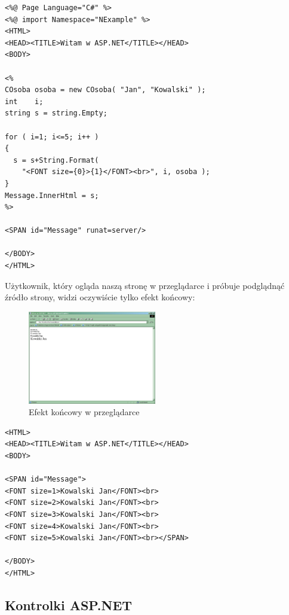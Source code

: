 \begin{scriptsize}
\begin{verbatim}
<%@ Page Language="C#" %>
<%@ import Namespace="NExample" %>
<HTML>
<HEAD><TITLE>Witam w ASP.NET</TITLE></HEAD>
<BODY>

<%
COsoba osoba = new COsoba( "Jan", "Kowalski" );
int    i;
string s = string.Empty;

for ( i=1; i<=5; i++ )
{
  s = s+String.Format( 
    "<FONT size={0}>{1}</FONT><br>", i, osoba );
}
Message.InnerHtml = s;
%>

<SPAN id="Message" runat=server/>

</BODY>
</HTML>
\end{verbatim}
\end{scriptsize}

Użytkownik, który ogląda naszą stronę w przeglądarce i próbuje podglądnąć źródło strony, widzi
oczywiście tylko efekt końcowy:

\begin{figure}
\begin{center}
\includegraphics[width=0.50\textwidth]{./pic/asp01}
\caption{Efekt końcowy w przeglądarce}
\end{center}
\end{figure}

\begin{scriptsize}
\begin{verbatim}
<HTML>
<HEAD><TITLE>Witam w ASP.NET</TITLE></HEAD>
<BODY>

<SPAN id="Message">
<FONT size=1>Kowalski Jan</FONT><br>
<FONT size=2>Kowalski Jan</FONT><br>
<FONT size=3>Kowalski Jan</FONT><br>
<FONT size=4>Kowalski Jan</FONT><br>
<FONT size=5>Kowalski Jan</FONT><br></SPAN>

</BODY>
</HTML>
\end{verbatim}
\end{scriptsize}

\subsection{Kontrolki ASP.NET}

